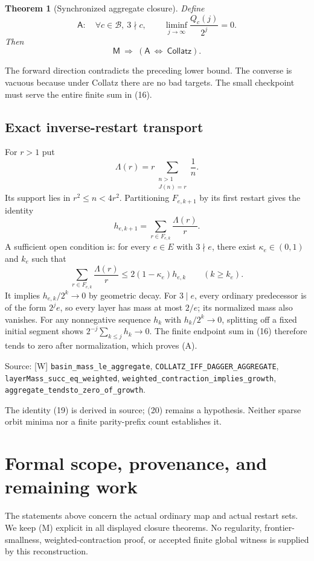 \documentclass[11pt,a4paper]{article}
\newtheorem{theorem}{Theorem}[section]
\theoremstyle{definition}
\newcommand{\CC}{\mathsf{Collatz}}
\newcommand{\MM}{\mathsf M}
\newcommand{\Agg}{\mathsf A}
\newcommand{\Bad}{\mathcal B}
\newcommand{\source}[1]{\par{\footnotesize\color{ink}Source: #1.}\par}
\begin{document}
\begin{theorem}[Synchronized aggregate closure]
Define
\[
 \Agg:\quad
 \forall c\in\Bad,\ 3\nmid c,\qquad
 \liminf_{j\to\infty}\frac{Q_c(j)}{2^j}=0.
\]
Then
\[
 \boxed{\MM\ \Longrightarrow\ (\Agg\ \Longleftrightarrow\ \CC).}
 \tag{18}
\]
\end{theorem}
The forward direction contradicts the preceding lower bound. The converse
is vacuous because under Collatz there are no bad targets. The small
checkpoint must serve the entire finite sum in (16).

\subsection*{Exact inverse-restart transport}
For $r>1$ put
\[
 \Lambda(r)=r\sum_{\substack{n>1\\J(n)=r}}\frac1n.
\]
Its support lies in $r^2\le n<4r^2$. Partitioning $F_{e,k+1}$ by
its first restart gives the identity
\[
 \boxed{h_{e,k+1}=\sum_{r\in F_{e,k}}\frac{\Lambda(r)}r.}
 \tag{19}
\]
A sufficient open condition is: for every $e\in E$ with $3\nmid e$,
there exist $\kappa_e\in(0,1)$ and $k_e$ such that
\[
 \sum_{r\in F_{e,k}}\frac{\Lambda(r)}r
 \le2(1-\kappa_e)h_{e,k}\qquad(k\ge k_e).
 \tag{20}
\]
It implies $h_{e,k}/2^k\to0$ by geometric decay.
For $3\mid e$, every ordinary predecessor is of the form $2^j e$,
so every layer has mass at most $2/e$; its normalized mass also vanishes.
For any nonnegative sequence $h_k$ with $h_k/2^k\to0$, splitting off
a fixed initial segment shows
$2^{-j}\sum_{k\le j}h_k\to0$.
The finite endpoint sum in (16) therefore tends to zero after normalization,
which proves (A).

\source{[W] \nolinkurl{basin_mass_le_aggregate},
\nolinkurl{COLLATZ_IFF_DAGGER_AGGREGATE},
\nolinkurl{layerMass_succ_eq_weighted},
\nolinkurl{weighted_contraction_implies_growth},
\nolinkurl{aggregate_tendsto_zero_of_growth}}
The identity (19) is derived in source; (20) remains a hypothesis.
Neither sparse orbit minima nor a finite parity-prefix count establishes it.

\newpage
\section{Formal scope, provenance, and remaining work}
The statements above concern the actual ordinary map and actual restart
sets. We keep (M) explicit in all displayed closure theorems. No regularity,
frontier-smallness, weighted-contraction proof, or accepted finite global
witness is supplied by this reconstruction.
\end{document}
